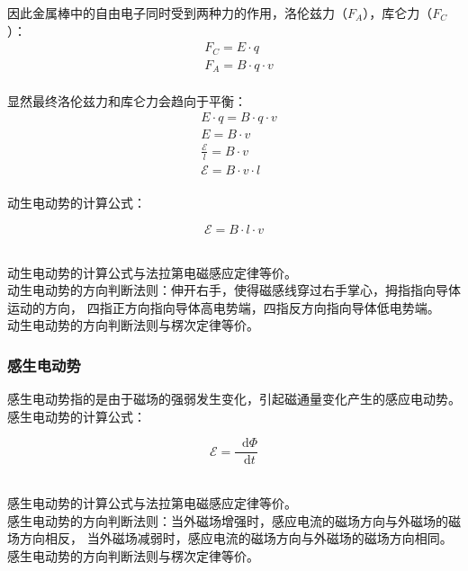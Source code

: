 \documentclass[UTF8]{ctexart}
\newcommand*{\dif}{\mathop{}\!\mathrm{d}}
\begin{document}
    因此金属棒中的自由电子同时受到两种力的作用，洛伦兹力（$F_A$），库仑力（$F_C$）：\vspace{5pt}
    \setcounter{equation}{0}
    \begin{align}
        &F_C=E\cdot q\\[3mm]
        &F_A=B\cdot q\cdot v
    \end{align}\\
    显然最终洛伦兹力和库仑力会趋向于平衡：\vspace{3pt}
    \begin{align}
        &E\cdot q=B\cdot q\cdot v\\[4mm]
        &E=B\cdot v\\[4mm]
        &\frac{\mathscr{E}}{l}=B\cdot v\\[4mm]
        &\mathscr{E}=B\cdot v\cdot l
    \end{align}\\
    动生电动势的计算公式：
    \begin{large}
        \begin{equation*}
            \mathscr{E}=B\cdot l\cdot v
        \end{equation*}
    \end{large}\\
    动生电动势的计算公式与法拉第电磁感应定律等价。\\[6mm]
    动生电动势的方向判断法则：伸开右手，使得磁感线穿过右手掌心，拇指指向导体运动的方向，
    四指正方向指向导体高电势端，四指反方向指向导体低电势端。\\[2mm]
    动生电动势的方向判断法则与楞次定律等价。\\

\subsubsection{感生电动势}
    感生电动势指的是由于磁场的强弱发生变化，引起磁通量变化产生的感应电动势。\\[3mm]
    感生电动势的计算公式：
    \begin{large}
        \begin{equation*}
            \mathscr{E}=\frac{\dif\Phi}{\dif t}
        \end{equation*}
    \end{large}\\
    感生电动势的计算公式与法拉第电磁感应定律等价。\\[6mm]
    感生电动势的方向判断法则：当外磁场增强时，感应电流的磁场方向与外磁场的磁场方向相反，
    当外磁场减弱时，感应电流的磁场方向与外磁场的磁场方向相同。\\[2mm]
    感生电动势的方向判断法则与楞次定律等价。
\end{document}
